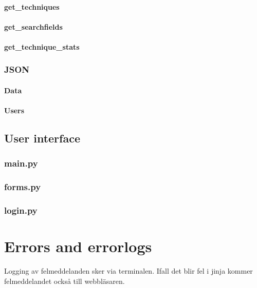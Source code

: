 \documentclass{TDP003mall}
\begin{document}
\paragraph{get\_techniques}
\paragraph{get\_searchfields}
\paragraph{get\_technique\_stats}

\subsubsection{JSON}
\paragraph{Data}
\paragraph{Users}

\subsection{User interface}

\subsubsection{main.py}

\subsubsection{forms.py}

\subsubsection{login.py}

\section{Errors and errorlogs}
Logging av felmeddelanden sker via terminalen. Ifall det blir fel i jinja kommer felmeddelandet också till webbläsaren.
\end{document}
